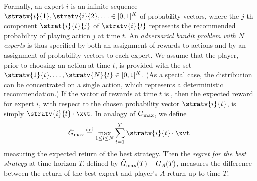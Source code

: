 \documentclass[12pt]{article}
\newcommand{\defeq}{\stackrel{\rm def}{=}}
\renewcommand{\i}[1]{i_{#1}}
\newcommand{\Gbest}{G_{\rm max}}
\newcommand{\Gbestst}{\tilde{G}_{\rm max}}
\begin{document}
Formally, an expert $i$ is an infinite sequence 
$\stratv{i}{1},\stratv{i}{2},\ldots \in [0,1]^K$
of probability vectors, where the $j$-th component
$\strat{i}{t}{j}$ of $\stratv{i}{t}$ represents
the recommended probability of playing action $j$
at time $t$. An {\em adversarial bandit problem with $N$ experts}
is thus specified by both an assignment of rewards to
actions and by an assignment of probability vectors to
each expert. We assume that the player, prior to choosing
an action at time $t$, is provided with the set
$\stratv{1}{t},\ldots,\stratv{N}{t} \in [0,1]^K$.
(As a special case, the distribution can be concentrated on a single action,
which represents a deterministic recommendation.)
If the vector of rewards at time $t$ is \xvt, then the expected
reward for expert $i$, with respect to the chosen probability vector
$\stratv{i}{t}$, is simply $\stratv{i}{t}\cdot\xvt$.
In analogy of $\Gbest$, we define
\[
\Gbestst \defeq \max_{1\leq i \leq N} \sum_{t=1}^T \stratv{i}{t}\cdot\xvt
\]
measuring the expected return of the best strategy.
Then the {\em regret for the best strategy} at time horizon $T$,
defined by $\Gbestst(T) - G_A(T)$, measures the difference between the
return of the best expert and player's $A$ return up to time $T$.

\end{document}
